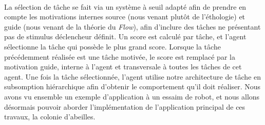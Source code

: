 		\paragraph{}
		La sélection de tâche se fait via un système à seuil adapté afin de prendre en compte les motivations internes source (nous venant plutôt de l'éthologie) et guide (nous venant de la théorie du \textit{Flow}), afin d'inclure des tâches ne présentant pas de stimulus déclencheur définit. Un score est calculé par tâche, et l'agent sélectionne la tâche qui possède le plus grand score. Lorsque la tâche précédemment réalisée est une tâche motivée, le score est remplacé par la motivation guide, interne à l'agent et transversale à toutes les tâches de cet agent. Une fois la tâche sélectionnée, l'agent utilise notre architecture de tâche en subsomption hiérarchique afin d'obtenir le comportement qu'il doit réaliser. Nous avons vu ensemble un exemple d'application à un essaim de robot, et nous allons désormais pouvoir aborder l'implémentation de l'application principal de ces travaux, la colonie d'abeilles.
